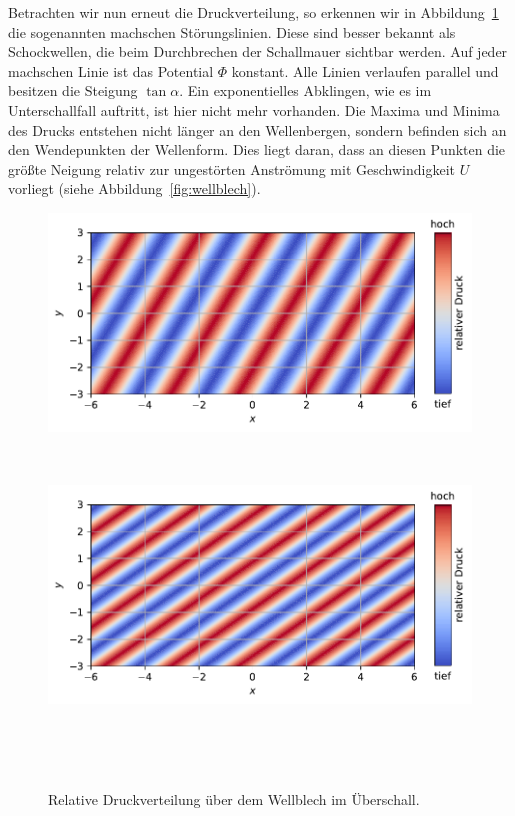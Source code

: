 Betrachten wir nun erneut die Druckverteilung, so erkennen wir in 
Abbildung~\ref{fig:druckvert_ueberschall} die sogenannten machschen Störungslinien. 
Diese sind besser bekannt als Schockwellen, 
die beim Durchbrechen der Schallmauer sichtbar werden. 
Auf jeder machschen Linie ist das Potential \(\Phi\) konstant. 
Alle Linien verlaufen parallel und besitzen die Steigung \(\tan \alpha\).
Ein exponentielles Abklingen, wie es im Unterschallfall auftritt, 
ist hier nicht mehr vorhanden. 
Die Maxima und Minima des Drucks entstehen nicht länger an den Wellenbergen, 
sondern befinden sich an den Wendepunkten der Wellenform. 
Dies liegt daran, dass an diesen Punkten die größte Neigung relativ zur 
ungestörten Anströmung mit Geschwindigkeit \(U\) vorliegt 
(siehe Abbildung~\ref{fig:wellblech}).
\begin{figure}
    \centering
    \begin{minipage}[b]{\textwidth}
        \centering
        \includegraphics[width=\linewidth]{papers/ueberschall/figures/druck_mach_kegel_400.pdf}
        \caption*{$U = 400\,\frac{\mathrm{m}}{\mathrm{s}}$}
        ~\label{fig:druckvert_ueberschall_u400}
    \end{minipage}
    \hfill
    \begin{minipage}[b]{\textwidth}
        \centering
        \includegraphics[width=\linewidth]{papers/ueberschall/figures/druck_mach_kegel_600.pdf}
        \caption*{$U = 600\,\frac{\mathrm{m}}{\mathrm{s}}$}
        ~\label{fig:druckvert_ueberschall_u600}
    \end{minipage}
    \caption{Relative Druckverteilung über dem Wellblech im Überschall.}
~\label{fig:druckvert_ueberschall}
\end{figure}